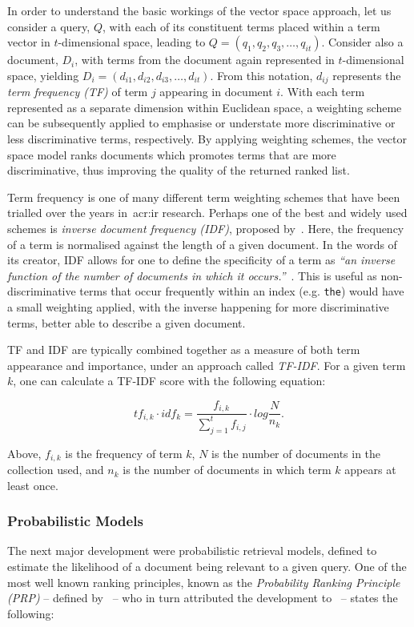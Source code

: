 In order to understand the basic workings of the vector space approach, let us consider a query, $Q$, with each of its constituent terms placed within a term vector in $t$-dimensional space, leading to $Q = (q_1, q_2, q_3,\dotsc, q_{it})$. Consider also a document, $D_i$, with terms from the document again represented in $t$-dimensional space, yielding $D_i = (d_{i1}, d_{i2}, d_{i3},\dotsc, d_{it})$. From this notation, $d_{ij}$ represents the \emph{term frequency (TF)} of term $j$ appearing in document $i$. With each term represented as a separate dimension within Euclidean space, a weighting scheme can be subsequently applied to emphasise or understate more discriminative or less discriminative terms, respectively. By applying weighting schemes, the vector space model ranks documents which promotes terms that are more discriminative, thus improving the quality of the returned ranked list.

Term frequency is one of many different term weighting schemes that have been trialled over the years in~\gls{acr:ir} research. Perhaps one of the best and widely used schemes is \emph{inverse document frequency (IDF)}, proposed by~\cite{sparck1972statistical}. Here, the frequency of a term is normalised against the length of a given document. In the words of its creator, IDF allows for one to define the specificity of a term as \emph{``an inverse function of the number of documents in which it occurs.''}~\citep{sparck1972statistical}. This is useful as non-discriminative terms that occur frequently within an index (e.g. \texttt{the}) would have a small weighting applied, with the inverse happening for more discriminative terms, better able to describe a given document.

TF and IDF are typically combined together as a measure of both term appearance and importance, under an approach called \emph{TF-IDF}. For a given term $k$, one can calculate a TF-IDF score with the following equation:

\begin{equation*}
tf_{i,k} \cdot idf_{k} = \frac{f_{i,k}}{\sum_{j=1}^{t} f_{i,j}} \cdot log \frac{N}{n_k}.
\end{equation*}

Above, $f_{i,k}$ is the frequency of term $k$, $N$ is the number of documents in the collection used, and $n_k$ is the number of documents in which term $k$ appears at least once.


\subsubsection{Probabilistic Models}
The next major development were probabilistic retrieval models, defined to estimate the likelihood of a document being relevant to a given query. One of the most well known ranking principles, known as the \emph{Probability Ranking Principle (PRP)} -- defined by~\cite{robertson1977prp} -- who in turn attributed the development to~\cite{cooper1971relevance} -- states the following:


